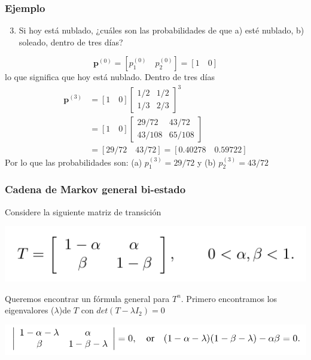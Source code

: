 \documentclass[spanish]{beamer}
\begin{document}
\begin{frame}
\frametitle{Ejemplo}
\begin{enumerate}
\setcounter{enumi}{2}
\item Si hoy está nublado, ¿cuáles son las probabilidades de que a) esté nublado, b) soleado, dentro de tres días?
\end{enumerate}

\begin{equation*}
\textbf{p}^{(0)}=\left[ p_{1}^{(0)} \quad p_{2}^{(0)}\right] =\left[ 1 \quad  0 \right]  
\end{equation*}
lo que significa que hoy está nublado. Dentro de tres días
\small
\begin{align*} 
\textbf{p}^{(3)}  & = \left[ 1 \quad  0 \right] {\begin{bmatrix} 1/2 & 1/2 \\ 1/3 & 2/3   \end{bmatrix}} ^3\\
& =\left[ 1 \quad  0 \right] {\begin{bmatrix} 29/72 & 43/72 \\ 43/108 & 65/108  \end{bmatrix}} \\
& =\left[ 29/72 \quad  43/72 \right] = \left[ 0.40278 \quad  0.59722 \right]
\end{align*}
Por lo que las probabilidades son: (a) $p_{1}^{(3)}= 29/72$ y (b) $p_{2}^{(3)}=43/72$ 
\end{frame}


\begin{frame}
\frametitle{Cadena de Markov general bi-estado}
Considere  la siguiente matriz de transición
\begin{center}
\includegraphics[scale=0.4]{im2}
\end{center}
Queremos encontrar un fórmula general para $T^{n}$. Primero encontramos los eigenvalores ($\lambda$)de $T$ con $det(T-\lambda I_{2})=0$
\begin{center}
\includegraphics[scale=0.35]{im3}
\end{center}
\end{frame}
\end{document}
